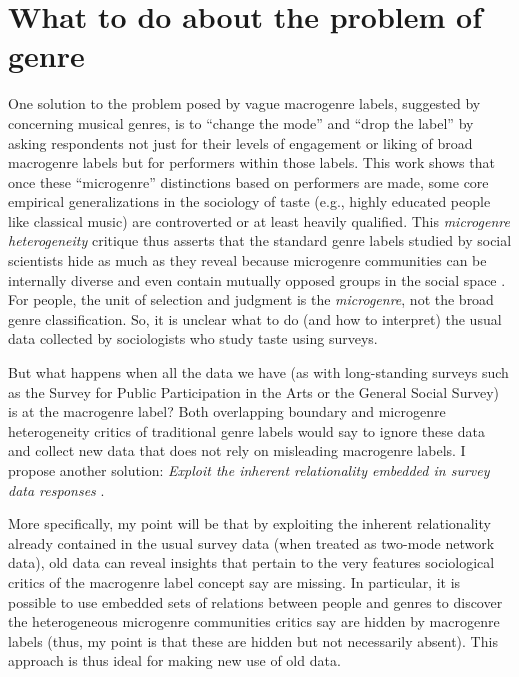 \documentclass[a4paper,12pt]{extarticle}
\begin{document}
\section{What to do about the problem of genre}
One solution to the problem posed by vague macrogenre labels, suggested by \citet{vlegels2015music, vlegels2017music} concerning musical genres, is to ``change the mode'' and ``drop the label'' by asking respondents not just for their levels of engagement or liking of broad macrogenre labels but for performers within those labels. This work shows that once these ``microgenre'' distinctions based on performers are made, some core empirical generalizations in the sociology of taste (e.g., highly educated people like classical music) are controverted or at least heavily qualified. This \textit{microgenre heterogeneity} critique thus asserts that the standard genre labels studied by social scientists hide as much as they reveal because microgenre communities can be internally diverse and even contain mutually opposed groups in the social space \citep{flemmen_etal18}. For people, the unit of selection and judgment is the {\em microgenre}, not the broad genre classification. So, it is unclear what to do (and how to interpret) the usual data collected by sociologists who study taste using surveys. 

But what happens when all the data we have (as with long-standing surveys such as the Survey for Public Participation in the Arts or the General Social Survey) is at the macrogenre label? Both overlapping boundary and microgenre heterogeneity critics of traditional genre labels would say to ignore these data and collect new data that does not rely on misleading macrogenre labels. I propose another solution: {\em Exploit the inherent relationality embedded in survey data responses} \citep{goldberg2011mapping, boutyline2017belief, lizardo18}. 

More specifically, my point will be that by exploiting the inherent relationality already contained in the usual survey data (when treated as two-mode network data), old data can reveal insights that pertain to the very features sociological critics of the macrogenre label concept say are missing. In particular, it is possible to use embedded sets of relations between people and genres to discover the heterogeneous microgenre communities critics say are hidden by macrogenre labels (thus, my point is that these are hidden but not necessarily absent). This approach is thus ideal for making new use of old data. 	
\end{document}
